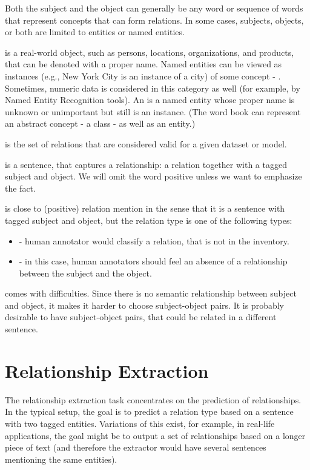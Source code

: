 Both the subject and the object can generally be any word or sequence of words that represent concepts that can form relations. In some cases, subjects, objects, or both are limited to entities or named entities.

 is a real-world object, such as persons, locations, organizations, and products, that can be denoted with a proper name. Named entities can be viewed as instances (e.g., New York City is an instance of a city) of some concept - . Sometimes, numeric data is considered in this category as well (for example, by Named Entity Recognition tools). An  is a named entity whose proper name is unknown or unimportant but still is an instance. (The word book can represent an abstract concept - a class - as well as an entity.) 

 is the set of relations that are considered valid for a given dataset or model.

 is a sentence, that captures a relationship: a relation together with a tagged subject and object. We will omit the word positive unless we want to emphasize the fact.

 is close to (positive) relation mention in the sense that it is a sentence with tagged subject and object, but the relation type is one of the following types: 
\begin{itemize}
\item {} - human annotator would classify a relation, that is not in the inventory.
\item {} - in this case, human annotators should feel an absence of a relationship between the subject and the object. 

\end{itemize}

 comes with difficulties. Since there is no semantic relationship between subject and object, it makes it harder to choose subject-object pairs. It is probably desirable to have subject-object pairs, that could be related in a different sentence.


\section{Relationship Extraction}
The relationship extraction task concentrates on the prediction of relationships. In the typical setup, the goal is to predict a relation type based on a sentence with two tagged entities. Variations of this exist, for example, in real-life applications, the goal might be to output a set of relationships based on a longer piece of text (and therefore the extractor would have several sentences mentioning the same entities). 

